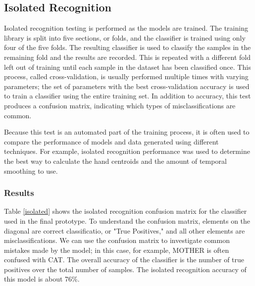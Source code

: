 \documentclass[12pt]{article}
\begin{document}
\subsection{Isolated Recognition}
Isolated recognition testing is performed as the models are trained. The training library is split into five sections, or folds, and the classifier is trained using only four of the five folds. The resulting classifier is used to classify the samples in the remaining fold and the results are recorded. This is repeated with a different fold left out of training until each sample in the dataset has been classified once. This process, called cross-validation, is usually performed multiple times with varying parameters; the set of parameters with the best cross-validation accuracy is used to train a classifier using the entire training set. In addition to accuracy, this test produces a confusion matrix, indicating which types of misclassifications are common.

Because this test is an automated part of the training process, it is often used to compare the performance of models and data generated using different techniques. For example, isolated recognition performance was used to determine the best way to calculate the hand centroids and the amount of temporal smoothing to use.

\subsubsection{Results}
Table \ref{isolated} shows the isolated recognition confusion matrix for the classifier used in the final prototype. To understand the confusion matrix, elements on the diagonal are correct classificatio, or "True Positives," and all other elements are misclassifications. We can use the confusion matrix to investigate common mistakes made by the model; in this case, for example, MOTHER is often confused with CAT. The overall accuracy of the classifier is the number of true positives over the total number of samples. The isolated recognition accuracy of this model is about 76\%.
\end{document}
